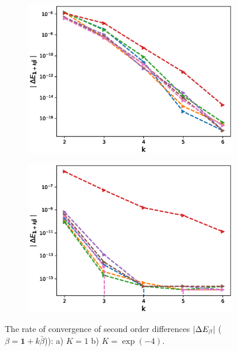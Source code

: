 \documentclass[11pt]{article}
\begin{document}
\begin{figure}[h!]
\centering
\begin{subfigure}{.5\textwidth}
\centering
\includegraphics[width=1\linewidth]{./figures/mixed_diff_second_way/H_007/N_16/mixed_difference_order2_rbergomi_16steps_H_007_K_1.eps}
\caption{}
\label{fig:sub3}
\end{subfigure}%
\begin{subfigure}{.5\textwidth}
\centering
\includegraphics[width=1\linewidth]{./figures/mixed_diff_second_way/H_007/N_16/mixed_difference_order2_rbergomi_16steps_H_007_K_exp__4.eps}
\caption{}
\label{fig:sub4}
\end{subfigure}

\caption{The rate of convergence of  second order differences $\left\lvert\Delta E_{\beta}\right\rvert$ ($\beta=\mathbf{1}+k \bar{\beta}$)): a) $K=1$ b)  $K=\operatorname{exp}(-4).$}
\label{fig:test2}
\end{figure}
\end{document}
